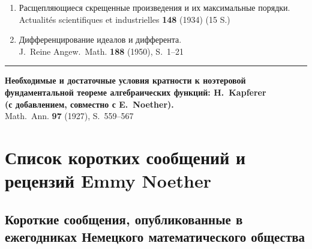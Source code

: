 \documentclass[11pt]{article}
\newcommand{\foreign}[1]{#1}
\begin{document}
\begin{enumerate}[label={\small\arabic*.},leftmargin=2em,itemsep=0.3em]
\item Расщепляющиеся скрещенные произведения и их максимальные порядки.\\
\foreign{Actualités scientifiques et industrielles} \textbf{148} (1934) (15 S.)

\item Дифференцирование идеалов и дифферента.\\
\foreign{J.\ Reine Angew.\ Math.} \textbf{188} (1950), S.~1--21
\end{enumerate}

\vspace{1em}
\noindent\rule{\textwidth}{0.4pt}
\vspace{0.5em}

\noindent\textbf{Необходимые и достаточные условия кратности к ноэтеровой}\\
\textbf{фундаментальной теореме алгебраических функций: H.\ Kapferer}\\
\textbf{(с добавлением, совместно с E.\ Noether).}\\
\foreign{Math.\ Ann.} \textbf{97} (1927), S.~559--567

\newpage
\section*{Список коротких сообщений и рецензий Emmy Noether}

\subsection*{Короткие сообщения, опубликованные в ежегодниках Немецкого математического общества}
\end{document}

